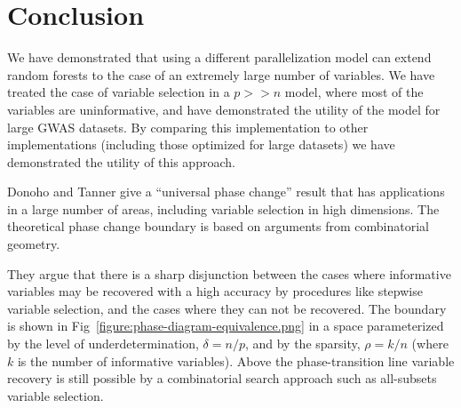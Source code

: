 \documentclass[10pt,letterpaper]{article}
\newcommand{\mtry}{\texttt{mtry}\xspace}
\begin{document}




\section{Conclusion}

We have demonstrated that using a different parallelization model can extend random forests to the case of an
extremely large number of variables. We have treated the case of variable selection in a $p >> n$ model, where most of
the variables are uninformative, and have demonstrated the utility of the model for large GWAS datasets. By comparing
this implementation to other implementations (including those optimized for large datasets) we have demonstrated the
utility of this approach.

Donoho and Tanner \cite{Donoho.and.Tanner.2009} give a ``universal phase change'' result that has applications in a
large number of areas, including variable selection in high dimensions. The theoretical phase change boundary is based on arguments
from combinatorial geometry.

They argue that there is a sharp disjunction between the cases where informative variables may be recovered with a high
accuracy by procedures like stepwise variable selection, and the cases where they can not be recovered. The boundary is
shown in Fig~\ref{figure:phase-diagram-equivalence.png} in a space parameterized by the level of underdetermination,
$\delta = n/p$, and by the sparsity, $\rho =k/n$ (where $k$ is the number of informative variables).  Above the
phase-transition line variable recovery is still possible by a combinatorial search approach such as all-subsets
variable selection. 
\end{document}
